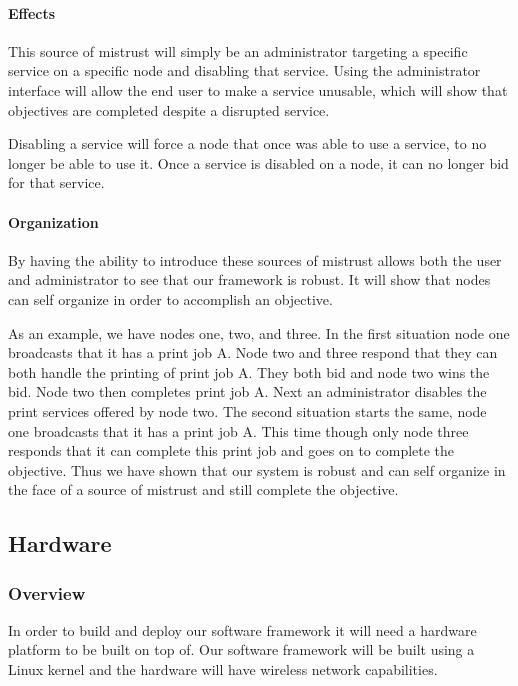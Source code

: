 \documentclass[draftclsnofoot, onecolumn, compsoc, 10pt]{IEEEtran}
\begin{document}
\paragraph{Effects}
This source of mistrust will simply be an administrator targeting a specific service on a specific node and disabling that service. Using the administrator interface will allow the end user to make a service unusable, which will show that objectives are completed despite a disrupted service.

Disabling a service will force a node that once was able to use a service, to no longer be able to use it. Once a service is disabled on a node, it can no longer bid for that service.

\paragraph{Organization}
By having the ability to introduce these sources of mistrust allows both the user and administrator to see that our framework is robust. It will show that nodes can self organize in order to accomplish an objective.

As an example, we have nodes one, two, and three. In the first situation node one broadcasts that it has a print job A. Node two and three respond that they can both handle the printing of print job A. They both bid and node two wins the bid. Node two then completes print job A. Next an administrator disables the print services offered by node two. The second situation starts the same, node one broadcasts that it has a print job A. This time though only node three responds that it can complete this print job and goes on to complete the objective. Thus we have shown that our system is robust and can self organize in the face of a source of mistrust and still complete the objective.
			




\subsection{Hardware}
\subsubsection{Overview} 
In order to build and deploy our software framework it will need a hardware platform to be built on top of. Our software framework will be built using a Linux kernel and the hardware will have wireless network capabilities. 
\end{document}
